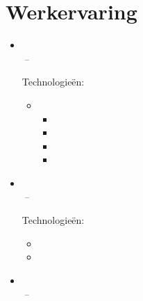 \documentclass[11pt,a4paper]{article}
\begin{document}
\section{Werkervaring}
\begin{itemize}[leftmargin=0pt,label={},itemsep=2em,topsep=0pt]
\item \parbox{\textwidth}{\textbf{\KhonraadNameNL} \hfill \textit{\KhonraadLocationNL}}\\
\textit{\KhonraadThirdJobTitleNL} \hfill \textit{\KhonraadFirstJobStartNL\,--\,\KhonraadThirdJobEndNL}

\vspace{0.2cm}
{\color{secondary}Technologieën:} \KhonraadTechnologyNL
\vspace{0.3cm}
\begin{itemize}[leftmargin=*,topsep=-6pt,parsep=0pt,partopsep=0pt,itemsep=0pt]
    \item \KhonraadInnovationNL
    \begin{itemize}[leftmargin=*,topsep=0pt,parsep=0pt,partopsep=0pt,itemsep=0pt,label={--}]
        \item \KhonraadChatbotsNL
        \item \KhonraadMobileNL
        \item \KhonraadAndroidNL
        \item \KhonraadMPSNL
    \end{itemize}
\end{itemize} 


\item \parbox{\textwidth}{\textbf{\McfunshineNameNL} \hfill \textit{\McfunshineLocationNL}}\\
\textit{\McfunshineJobTitleNL} \hfill \textit{\McfunshineJobStartNL\,--\,\McfunshineJobEndNL}

\vspace{0.2cm}
{\color{secondary}Technologieën:} \McfunshinePodmorphTechnologyNL
\vspace{0.3cm}
\begin{itemize}[leftmargin=*,topsep=-6pt,parsep=0pt,partopsep=0pt,itemsep=0pt]
    \item \McfunshinePodmorphNL
    \item \McfunshinePodmorphAINL
\end{itemize}


\item \parbox{\textwidth}{\textbf{\BakerNameNL} \hfill \textit{\BakerLocationNL}}\\
\textit{\BakerFirstJobTitleNL} \hfill \textit{\BakerFirstJobStartNL\,--\,\BakerSecondJobEndNL}


\end{itemize}
\end{document}
